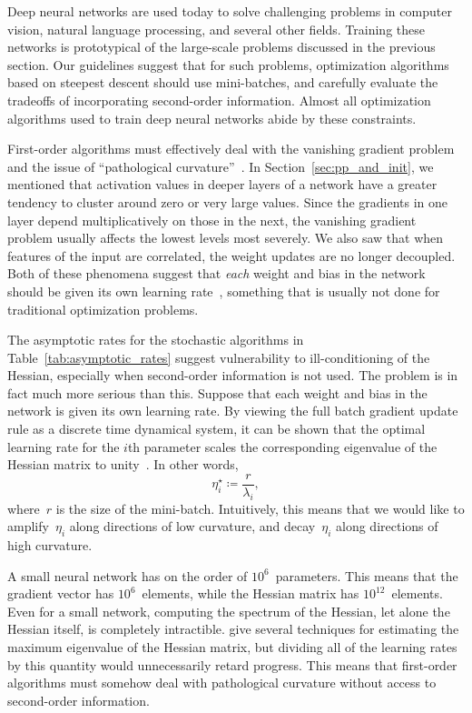 \documentclass[11pt,a4paper]{article}
\numberwithin{equation}{section}
\begin{document}
Deep neural networks are used today to solve challenging problems in computer
vision, natural language processing, and several other fields. Training these
networks is prototypical of the large-scale problems discussed in the previous
section. Our guidelines suggest that for such problems, optimization algorithms
based on steepest descent should use mini-batches, and carefully evaluate the
tradeoffs of incorporating second-order information. Almost all optimization
algorithms used to train deep neural networks abide by these constraints.

First-order algorithms must effectively deal with the vanishing gradient problem
and the issue of ``pathological curvature''~\citep{martens2010deep}. In
Section~\ref{sec:pp_and_init}, we mentioned that activation values in deeper
layers of a network have a greater tendency to cluster around zero or very large
values. Since the gradients in one layer depend multiplicatively on those in the
next, the vanishing gradient problem usually affects the lowest levels most
severely. We also saw that when features of the input are correlated, the weight
updates are no longer decoupled. Both of these phenomena suggest that
\emph{each} weight and bias in the network should be given its own learning
rate~\citep{lecun-98b}, something that is usually not done for traditional
optimization problems.

The asymptotic rates for the stochastic algorithms in
Table~\ref{tab:asymptotic_rates} suggest vulnerability to ill-conditioning of
the Hessian, especially when second-order information is not used. The problem
is in fact much more serious than this. Suppose that each weight and bias in the
network is given its own learning rate. By viewing the full batch gradient
update rule as a discrete time dynamical system, it can be shown that the
optimal learning rate for the $i$th parameter scales the corresponding
eigenvalue of the Hessian matrix to unity~\citep{lecun-98b}. In other words,
\[
	\eta_i^\star \coloneqq \frac{r}{\lambda_i},
\]
where~$r$ is the size of the mini-batch. Intuitively, this means that we would
like to amplify~$\eta_i$ along directions of low curvature, and decay~$\eta_i$
along directions of high curvature.

A small neural network has on the order of $10^6$~parameters. This means that
the gradient vector has $10^6$~elements, while the Hessian matrix has
$10^{12}$~elements. Even for a small network, computing the spectrum of the
Hessian, let alone the Hessian itself, is completely intractible.
\citet{lecun-98b} give several techniques for estimating the maximum eigenvalue
of the Hessian matrix, but dividing all of the learning rates by this quantity
would unnecessarily retard progress. This means that first-order algorithms must
somehow deal with pathological curvature without access to second-order
information.
\end{document}
